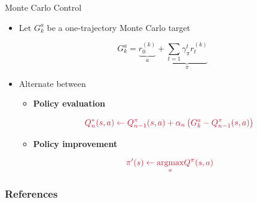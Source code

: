 \documentclass[11pt,table]{beamer}
\begin{document}
\begin{frame}{Monte Carlo Control}


\begin{itemize}
    \item Let $G_{k}^{a}$ be a one-trajectory Monte Carlo target


$$
G_{k}^{a}=\underbrace{r_{0}^{(k)}}_{a}+\underbrace{\sum_{t=1} \gamma_{\pi}^{t} r_{t}^{(k)}}_{\pi}
$$

\item Alternate between

\begin{itemize}
     
\item  \textbf{Policy evaluation}

$$
\textcolor{red1}{Q_{n}^{*}(s, a) \leftarrow Q_{n-1}^{\pi}(s, a)+\alpha_{n}\left(G_{k}^{a}-Q_{n-1}^{\pi}(s, a)\right)}
$$
\item  \textbf{Policy improvement}

$$
\textcolor{red1}{\pi^{\prime}(s) \leftarrow \underset{a}{\operatorname{argmax}} Q^{\pi}(s, a)}
$$ 
\end{itemize}
    \end{itemize}
\end{frame}


%
%
%


\begin{frame}[t,allowframebreaks
]\nocite{*}
\frametitle{References}
\footnotesize

\end{frame}
\end{document}
